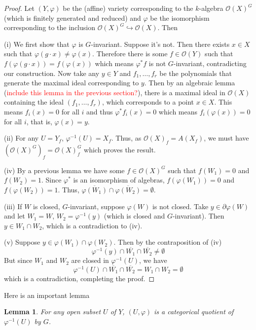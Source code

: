 \documentclass[12pt]{article}
\newtheorem{lemma}{Lemma}[section]
\theoremstyle{remark}
\theoremstyle{definition}
\begin{document}
    \begin{proof}
        Let $(Y,\varphi)$ be the (affine) variety corresponding to the $k$-algebra $\mathcal O(X)^G$ (which is finitely generated and reduced) and $\varphi$ be the isomorphism corresponding to the inclusion $\mathcal O(X)^G\hookrightarrow \mathcal O(X)$. Then

        (i) We first show that $\varphi$ is $G$-invariant. Suppose it's not. Then there exists $x\in X$ such that $\varphi(g\cdot x)\neq\varphi(x)$. Therefore there is some $f\in \mathcal O(Y)$ such that $f(\varphi(g\cdot x))=f(\varphi(x))$ which means $\varphi^*f$ is not $G$-invariant, contradicting our construction. Now take any $y\in Y$ and $f_1,\dots, f_r$ be the polynomials that generate the maximal ideal corresponding to $y$. Then by an algebraic lemma (\textcolor{red}{include this lemma in the previous section?}), there is a maximal ideal in $\mathcal O(X)$ containing the ideal $(f_1,\dots, f_r)$, which corresponds to a point $x\in X$. This means $f_i(x)=0$ for all $i$ and thus $\varphi^*f_i(x)=0$ which means $f_i(\varphi(x))=0$ for all $i$, that is, $\varphi(x)=y$.

        (ii) For any $U=Y_f$, $\varphi^{-1}(U)=X_f$. Thus, as $\mathcal O(X)_f=A(X_f)$, we must have $(\mathcal O(X)^G)_f=\mathcal O(X)_f^G$ which proves the result.

        (iv) By a previous lemma we have some $f\in \mathcal O(X)^G$ such that $f(W_1)=0$ and $f(W_2)=1$. Since $\varphi^*$ is an isomorphism of algebras, $f(\varphi(W_1))=0$ and $f(\varphi(W_2))=1$. Thus, $\overline{\varphi(W_1)}\cap\overline{\varphi(W_2)}=\emptyset$.

        (iii) If $W$ is closed, $G$-invariant, suppose $\varphi(W)$ is not closed. Take $y\in\partial\varphi(W)$ and let $W_1=W$, $W_2=\varphi^{-1}(y)$ (which is closed and $G$-invariant). Then $y\in W_1\cap W_2$, which is a contradiction to (iv).

        (v) Suppose $y\in \varphi(W_1)\cap\varphi(W_2)$. Then by the contraposition of (iv)
        \[\varphi^{-1}(y)\cap \overline{W_1}\cap \overline{W_2}\neq \emptyset\]
        But since $W_1$ and $W_2$ are closed in $\varphi^{-1}(U)$, we have
        \[\varphi^{-1}(U)\cap \overline{W_1}\cap \overline{W_2}=W_1\cap W_2=\emptyset\]
        which is a contradiction, completing the proof.
    \end{proof}
    Here is an important lemma
    \begin{lemma}
        For any open subset $U$ of $Y$, $(U,\varphi)$ is a categorical quotient of $\varphi^{-1}(U)$ by $G$.
    \end{lemma}
\end{document}
